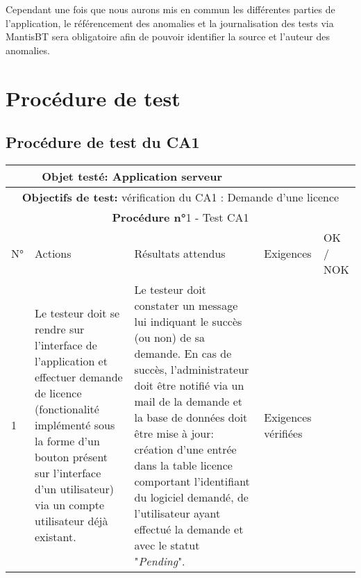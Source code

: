 Cependant une fois que nous aurons mis en commun les différentes parties de l'application, le
référencement des anomalies et la journalisation des tests via MantisBT sera obligatoire afin de
pouvoir identifier la source et l'auteur des anomalies.


\chapter{Procédure de test}

\section{Procédure de test du CA1}
\begin{table}[!h]
        \centering
        \begin{tabular}{|m{0.6cm}|
                         >{\raggedright\arraybackslash}m{4cm}|
                         >{\raggedright\arraybackslash}m{6.4cm}|
                         >{\raggedright\arraybackslash}m{2cm}|
                         m{1cm}|}
            \hline
            \multicolumn{3}{|c|}{
                \textbf{Objet testé: } Application serveur 
            } & \multicolumn{2}{|c|}{
                \textbf{Version: } version    
            } \\
            \hline
            \multicolumn{5}{|c|}{\textbf{Objectifs de test:} 
                vérification du CA1 : Demande d'une licence} \\
            \hline
            \multicolumn{5}{|c|}{
                \textbf{Procédure n°}1 - Test CA1
            } \\
            \hline
            N° & Actions & Résultats attendus & Exigences & OK / NOK \\
            \hline      %
            1 & Le testeur doit se rendre sur l'interface de l'application et 
                effectuer demande de licence (fonctionalité implémenté 
                sous la forme d'un bouton présent sur l'interface d'un
                utilisateur) via un compte utilisateur déjà existant. 
              & Le testeur doit constater un message lui indiquant le succès (ou non)
                de sa demande. En cas de succès, l'administrateur doit être notifié via 
                un mail de la demande et la base de données doit être mise à jour: 
                création d'une entrée dans la table licence comportant l'identifiant du
                logiciel demandé, de l'utilisateur ayant effectué la demande et avec le 
                statut "\emph{Pending}".
              & Exigences vérifiées & \\
            \hline
        \end{tabular} 
        \label{tab:tab1}
\end{table}
\newpage

